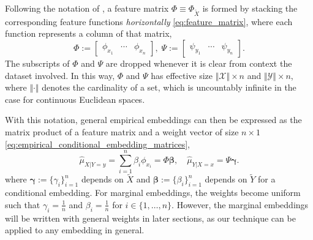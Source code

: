 \documentclass[twoside]{article} \usepackage{aistats2017}
\theoremstyle{definition}
\theoremstyle{theorem}
\newcommand{\rv}[1]{{#1}}
\newcommand{\ds}[1]{\tilde{#1}}
\newcommand{\hatmuYx}{\hat{\mu}_{\rv{Y} | \rv{X} = x}}
\newcommand{\hatmuXy}{\hat{\mu}_{\rv{X} | \rv{Y} = y}}
\newcommand{\cardX}{\Vert \mathcal{X} \Vert}
\newcommand{\cardY}{\Vert \mathcal{Y} \Vert}
\begin{document}
%			
%			
%			
			Following the notation of \cite{muandet2016kernel}, a feature matrix $\Phi \equiv \Phi_{\ds{X}}$ is formed by stacking the corresponding feature functions \textit{horizontally} \eqref{eq:feature_matrix}, where each function represents a column of that matrix,	
			\begin{equation}
				\Phi := \begin{bmatrix} \phi_{x_{1}} & \cdots & \phi_{x_{n}} \end{bmatrix}, \; \Psi := \begin{bmatrix} \psi_{y_{1}} & \cdots & \psi_{y_{n}} \end{bmatrix}.
			\label{eq:feature_matrix}
			\end{equation}
			The subscripts of $\Phi$ and $\Psi$ are dropped whenever it is clear from context the dataset involved. In this way, $\Phi$ and $\Psi$ has effective size $\cardX \times n$ and $\cardY \times n$, where $\Vert \cdot \Vert$ denotes the cardinality of a set, which is uncountably infinite in the case for continuous Euclidean spaces.
			
			With this notation, general empirical embeddings can then be expressed as the matrix product of a feature matrix and a weight vector of size $n \times 1$ \eqref{eq:empirical_conditional_embedding_matrices},
			\begin{equation}
			\hatmuXy = \sum_{i = 1}^{n} \beta_{i} \phi_{x_{i}} = \Phi \bm{\beta} ,\quad \hatmuYx = \Psi \bm{\gamma}.
			\label{eq:empirical_conditional_embedding_matrices}
			\end{equation}			
			where $\bm{\gamma} := \{\gamma_{i}\}_{i = 1}^{n}$ depends on $\ds{X}$ and $\bm{\beta} := \{\beta_{i}\}_{i = 1}^{n}$ depends on $\ds{Y}$ for a conditional embedding. For marginal embeddings, the weights become uniform such that $\gamma_{i} = \frac{1}{n}$ and $\beta_{i} = \frac{1}{n}$ for $i \in \{1, \dots, n\}$. However, the marginal embeddings will be written with general weights in later sections, as our technique can be applied to any embedding in general.
\end{document}
